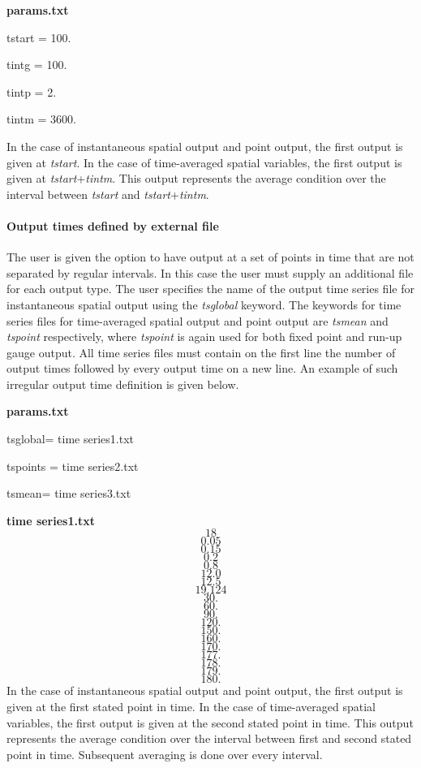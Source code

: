 \documentclass{article}
\begin{document}
\noindent \textbf{params.txt}

\noindent tstart = 100.

\noindent tintg = 100.

\noindent tintp = 2.

\noindent tintm = 3600.

\noindent In the case of instantaneous spatial output and point output, the first output is given at \textit{tstart}. In the case of time-averaged spatial variables, the first output is given at \textit{tstart}+\textit{tintm}. This output represents the average condition over the interval between \textit{tstart} and \textit{tstart}+\textit{tintm}. 


\paragraph{ Output times defined by external file}

\noindent The user is given the option to have output at a set of points in time that are not separated by regular intervals. In this case the user must supply an additional file for each output type. The user specifies the name of the output time series file for instantaneous spatial output using the \textit{tsglobal} keyword. The keywords for time series files for time-averaged spatial output and point output are \textit{tsmean} and \textit{tspoint} respectively, where \textit{tspoint} is again used for both fixed point and run-up gauge output. All time series files must contain on the first line the number of output times followed by every output time on a new line. An example of such irregular output time definition is given below.

\noindent \textbf{params.txt}

\noindent tsglobal= time series1.txt

\noindent tspoints = time series2.txt

\noindent tsmean= time series3.txt

\noindent \textbf{time series1.txt}
\[18\] 
\[0.05\] 
\[0.15\] 
\[0.2\] 
\[0.8\] 
\[12.0\] 
\[12.5\] 
\[19.124\] 
\[30.\] 
\[60.\] 
\[90.\] 
\[120.\] 
\[150.\] 
\[160.\] 
\[170.\] 
\[177.\] 
\[178.\] 
\[179.\] 
\[180.\] 
In the case of instantaneous spatial output and point output, the first output is given at the first stated point in time. In the case of time-averaged spatial variables, the first output is given at the second stated point in time. This output represents the average condition over the interval between first and second stated point in time. Subsequent averaging is done over every interval.
\end{document}
